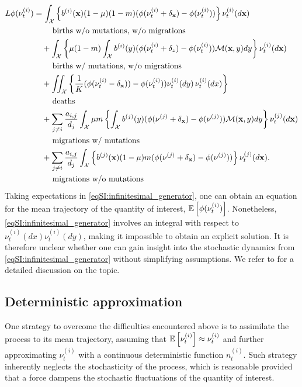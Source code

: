     \begin{align} \label{eqSI:infinitesimal_generator}
        L\phi(\nu^{(i)}_t) &= \int_\mathcal{X} \left\{ b^{(i)}({\textbf x}) (1 - \mu ) (1 - m)( \phi(\nu^{(i)}_t + \delta_{{\textbf x}}) - \phi(\nu^{(i)}_t))\right\} \nu^{(i)}_t(d{\textbf x}) \nonumber\\
          &\qquad \text{ births w/o mutations, w/o migrations} \nonumber\\
        &\quad + \int_\mathcal{X}  \left\{\mu (1-m) \int_\mathcal{X} b^{(i)}(y) (\phi(\nu^{(i)}_t + \delta_z) - \phi(\nu^{(i)}_t))\mathcal{M}({\textbf x},y) dy \right\} \nu^{(i)}_t(d{\textbf x}) \nonumber\\
         &\qquad \text{ births w/ mutations, w/o migrations} \nonumber\\
        &\quad + \iint_\mathcal{X} \left\{ \frac{1}{K}(\phi(\nu^{(i)}_t - \delta_{{\textbf x}})) - \phi(\nu^{(i)}_t))\nu^{(i)}_t(d y) \, \nu^{(i)}_t(dx)  \right\} \nonumber\\
        &\qquad \text{ deaths} \nonumber\\
        &\quad + \sum_{j \neq i } \frac{a_{i,j}}{d_j} \int_\mathcal{X}  \mu m \left\{ \int_\mathcal{X} b^{(j)}(y) (\phi(\nu^{(j)} +  \delta_{\textbf x}) - \phi(\nu^{(j)}))\mathcal{M}({\textbf x}, y)dy \right\} \nu^{(j)}_t(d{\textbf x}) \nonumber \\
         &\qquad \text{ migrations w/ mutations} \nonumber\\
        &\quad + \sum_{j\neq i}\frac{a_{i,j}}{d_j} \int_\mathcal{X} \left\{ b^{(j)}({\textbf x}) (1 - \mu ) m ( \phi(\nu^{(j)} + \delta_{{\textbf x}}) - \phi(\nu^{(j)})) \right\} \nu^{(j)}_t(d{\textbf x}). \\
        &\qquad \text{ migrations w/o mutations} \nonumber
    \end{align}
    \normalsize
    Taking expectations in \cref{eqSI:infinitesimal_generator}, one can obtain an equation for the mean trajectory of the quantity of interest, $ {\mathbb{E}} \left[ \phi(\nu^{(i)}_t) \right]$. Nonetheless, \cref{eqSI:infinitesimal_generator} involves an integral with respect to $\nu^{(i)}_t(dx) \nu^{(i)}_t(dy)$, making it impossible to obtain an explicit solution. It is therefore unclear whether one can gain insight into the stochastic dynamics from \cref{eqSI:infinitesimal_generator} without simplifying assumptions. We refer to \citep{Champagnat2006} for a detailed discussion on the topic.
    
    \subsection{Deterministic approximation} 
    One strategy to overcome the difficulties encountered above is to assimilate the process to its mean trajectory, assuming that ${\mathbb{E}} \left[ \nu^{(i)}_t \right] \approx \nu^{(i)}_t$ and further approximating $\nu^{(i)}_t$ with a continuous deterministic function $n_t^{(i)}$. Such strategy inherently neglects the stochasticity of the process, which is reasonable provided that a force dampens the stochastic fluctuations of the quantity of interest.
    

